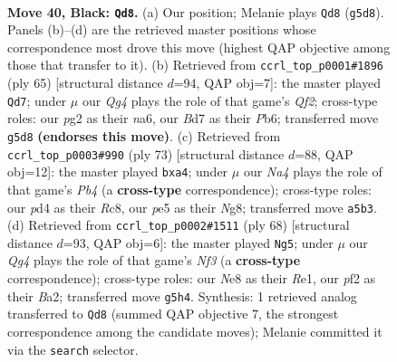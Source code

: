 \documentclass[11pt]{article}
\begin{document}
\clearpage

\begin{figure}[p]\centering
\begin{subfigure}{0.46\textwidth}\centering
\resizebox{\linewidth}{!}{%
\newchessgame
\chessboard[
  setfen={4n3/3b2k1/p6r/n2BPpqp/PQ1P2p1/N7/5PPP/R3K1N1 b - - 3 40},
  showmover=false,
  pgfstyle=straightmove, color=movearrow, markmove={g5-d8}
]}
\caption{}
\end{subfigure}\hfill
\begin{subfigure}{0.46\textwidth}\centering
\resizebox{\linewidth}{!}{%
\newchessgame
\chessboard[
  setfen={8/p4q1k/NpnB1bpp/5p2/2p4P/2P2PP1/PP1Q2K1/8 b - - 1 33},
  showmover=false,
  pgfstyle=straightmove, color=movearrow, markmove={f7-d7}
]}
\caption{}
\end{subfigure}
\\[4pt]
\begin{subfigure}{0.46\textwidth}\centering
\resizebox{\linewidth}{!}{%
\newchessgame
\chessboard[
  setfen={2r3nk/3r4/5q1p/Np3pp1/PP1p4/3P1BP1/3Q1P1P/4R1K1 b - - 0 37},
  showmover=false,
  pgfstyle=straightmove, color=movearrow, markmove={b5-a4}
]}
\caption{}
\end{subfigure}\hfill
\begin{subfigure}{0.46\textwidth}\centering
\resizebox{\linewidth}{!}{%
\newchessgame
\chessboard[
  setfen={2bq4/2rn2kp/p2p2p1/1p1Pp3/1P2P3/P4N2/B2Q1PP1/4R1K1 w - - 1 35},
  showmover=false,
  pgfstyle=straightmove, color=movearrow, markmove={f3-g5}
]}
\caption{}
\end{subfigure}
\caption{\textbf{Move 40, Black: \texttt{Qd8}.} (a) Our position; Melanie plays \texttt{Qd8} (\texttt{g5d8}). Panels (b)--(d) are the retrieved master positions whose correspondence most drove this move (highest QAP objective among those that transfer to it). (b) Retrieved from \texttt{ccrl\_top\_p0001\#1896} (ply 65) [structural distance $d$=94, QAP obj=7]: the master played \texttt{Qd7}; under $\mu$ our \emph{Qg4} plays the role of that game's \emph{Qf2}; cross-type roles: our \emph{p}g2 as their \emph{n}a6, our \emph{B}d7 as their \emph{P}b6; transferred move \texttt{g5d8} \textbf{(endorses this move)}. (c) Retrieved from \texttt{ccrl\_top\_p0003\#990} (ply 73) [structural distance $d$=88, QAP obj=12]: the master played \texttt{bxa4}; under $\mu$ our \emph{Na4} plays the role of that game's \emph{Pb4} (a \textbf{cross-type} correspondence); cross-type roles: our \emph{p}d4 as their \emph{R}c8, our \emph{p}e5 as their \emph{N}g8; transferred move \texttt{a5b3}. (d) Retrieved from \texttt{ccrl\_top\_p0002\#1511} (ply 68) [structural distance $d$=93, QAP obj=6]: the master played \texttt{Ng5}; under $\mu$ our \emph{Qg4} plays the role of that game's \emph{Nf3} (a \textbf{cross-type} correspondence); cross-type roles: our \emph{N}e8 as their \emph{R}e1, our \emph{p}f2 as their \emph{B}a2; transferred move \texttt{g5h4}. Synthesis: 1 retrieved analog transferred to \texttt{Qd8} (summed QAP objective 7, the strongest correspondence among the candidate moves); Melanie committed it via the \texttt{search} selector.}
\label{fig:thought-m79}
\end{figure}
\end{document}
